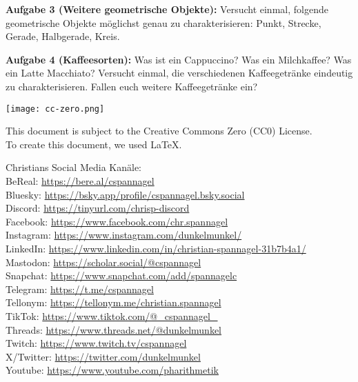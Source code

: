 \documentclass[12pt,a4paper,oneside,ngerman]{article}
\begin{document}
\textbf{Aufgabe 3 (Weitere geometrische Objekte):} Versucht einmal, folgende geometrische Objekte möglichst genau zu charakterisieren: Punkt, Strecke, Gerade, Halbgerade, Kreis.

\textbf{Aufgabe 4 (Kaffeesorten):} Was ist ein Cappuccino? Was ein Milchkaffee? Was ein Latte Macchiato? Versucht einmal, die verschiedenen Kaffeegetränke eindeutig zu charakterisieren. Fallen euch weitere Kaffeegetränke ein?


\vspace*{10mm}
\texttt{[image: cc-zero.png]}

\tiny{This document is subject to the Creative Commons Zero (CC0) License.
\\ To create this document, we used \LaTeX{}.

Christians Social Media Kanäle:\\
BeReal: \url{https://bere.al/cspannagel}\\
Bluesky: \url{https://bsky.app/profile/cspannagel.bsky.social}\\
Discord: \url{https://tinyurl.com/chrisp-discord}\\
Facebook: \url{https://www.facebook.com/chr.spannagel}\\
Instagram: \url{https://www.instagram.com/dunkelmunkel/}\\
LinkedIn: \url{https://www.linkedin.com/in/christian-spannagel-31b7b4a1/}\\
Mastodon: \url{https://scholar.social/@cspannagel}\\
Snapchat: \url{https://www.snapchat.com/add/spannagelc}\\
Telegram: \url{https://t.me/cspannagel}\\
Tellonym: \url{https://tellonym.me/christian.spannagel}\\
TikTok: \url{https://www.tiktok.com/@_cspannagel_}\\
Threads: \url{https://www.threads.net/@dunkelmunkel}\\
Twitch: \url{https://www.twitch.tv/cspannagel}\\
X/Twitter: \url{https://twitter.com/dunkelmunkel}\\
Youtube: \url{https://www.youtube.com/pharithmetik}}\\


\end{document}
